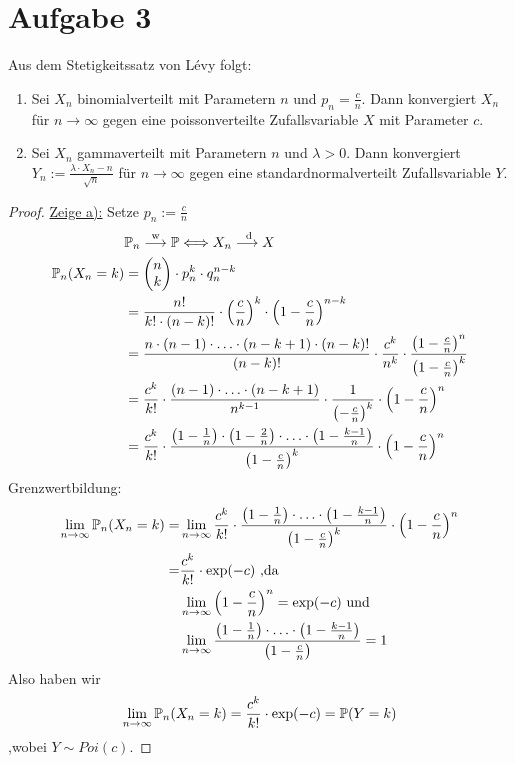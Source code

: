 \documentclass[12pt,a4paper]{article}
\begin{document}
\section*{Aufgabe 3}
Aus dem Stetigkeitssatz von Lévy folgt:
\begin{enumerate}[label=\alph*)]
	\item Sei $X_n$ binomialverteilt mit Parametern $n$ und $p_n=\frac{c}{n}$.
	Dann konvergiert $X_n$ für $n\to\infty$ gegen eine poissonverteilte Zufallsvariable $X$ mit Parameter $c$.
	\item Sei $X_n$ gammaverteilt mit Parametern $n$ und $\lambda>0$.
	Dann konvergiert $Y_n:=\frac{\lambda\cdot X_n-n}{\sqrt{n}}$ für $n\to\infty$ gegen eine standardnormalverteilt Zufallsvariable $Y$.
\end{enumerate}

\begin{proof}
	\underline{Zeige a):} Setze $p_n:=\frac{c}{n}$
	\begin{align*}
		&\mathbb{P}_n\overset{\text{w}}{\longrightarrow} \mathbb{P}
		\Longleftrightarrow X_n\overset{\text{ d}}{\longrightarrow} X\\
		\mathbb{P}_n(X_n=k)&=\begin{pmatrix}
			n\\
			k
		\end{pmatrix}\cdot p_n^k\cdot q_n^{n-k}\\
		&=\frac{n!}{k!\cdot(n-k)!}\cdot\left(\frac{c}{n}\right)^k\cdot\left(1-\frac{c}{n}\right)^{n-k}\\
		&=\frac{n\cdot(n-1)\cdot\ldots\cdot(n-k+1)\cdot(n-k)!}{(n-k)!}\cdot\frac{c^k}{n^k}\cdot\frac{\left(1-\frac{c}{n}\right)^n}{\left(1-\frac{c}{n}\right)^k}\\
		&=\frac{c^k}{k!}\cdot\frac{(n-1)\cdot\ldots\cdot(n-k+1)}{n^{k-1}}\cdot\frac{1}{\left(-\frac{c}{n}\right)^k}\cdot\left(1-\frac{c}{n}\right)^n\\
		&=\frac{c^k}{k!}\cdot\frac{\left(1-\frac{1}{n}\right)\cdot\left(1-\frac{2}{n}\right)\cdot\ldots\cdot\left(1-\frac{k-1}{n}\right)}{\left(1-\frac{c}{n}\right)^k}\cdot\left(1-\frac{c}{n}\right)^n
	\end{align*}
	Grenzwertbildung:
	\begin{align*}
		\lim\limits_{n\to\infty}\mathbb{P}_n(X_n=k)
		=&\lim\limits_{n\to\infty}\frac{c^k}{k!}\cdot\frac{\left(1-\frac{1}{n}\right)\cdot\ldots\cdot\left(1-\frac{k-1}{n}\right)}{\left(1-\frac{c}{n}\right)^k}\cdot\left(1-\frac{c}{n}\right)^n\\
		=&\frac{c^k}{k!}\cdot\exp(-c) \text{ ,da} \\
		 &\lim\limits_{n\to\infty}\left(1-\frac{c}{n}\right)^n=\exp(-c) \text{ und}\\
		&\lim\limits_{n\to\infty}\frac{\left(1-\frac{1}{n}\right)\cdot\ldots\cdot\left(1-\frac{k-1}{n}\right)}{\left(1-\frac{c}{n}\right)}=1
	\end{align*}
	Also haben wir
	\begin{align*}
		\lim\limits_{n\to\infty} \mathbb{P}_n(X_n =k) = \frac{c^k}{k!}\cdot\exp(-c) = \mathbb{P}(Y=k)
	\end{align*}
	,wobei $Y\sim Poi(c)$.
	

\end{proof}
\end{document}
